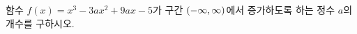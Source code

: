 함수 $f(x)=x^3-3ax^2+9ax-5$가 구간 $(-\infty{,}\mkern3mu\mathopen{}\infty)$에서 증가하도록 하는 정수 $a$의 개수를 구하시오.
